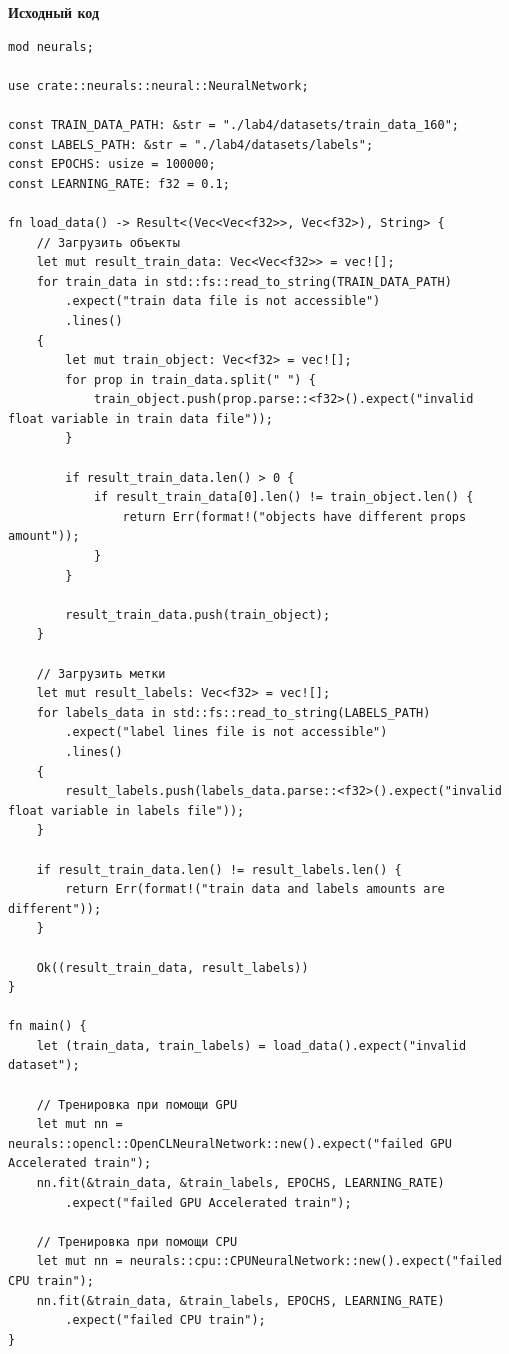 \documentclass[a4paper,14pt]{extarticle}
\begin{document}
\textbf{Исходный код}
\begin{verbatim}
mod neurals;

use crate::neurals::neural::NeuralNetwork;

const TRAIN_DATA_PATH: &str = "./lab4/datasets/train_data_160";
const LABELS_PATH: &str = "./lab4/datasets/labels";
const EPOCHS: usize = 100000;
const LEARNING_RATE: f32 = 0.1;

fn load_data() -> Result<(Vec<Vec<f32>>, Vec<f32>), String> {
    // Загрузить объекты
    let mut result_train_data: Vec<Vec<f32>> = vec![];
    for train_data in std::fs::read_to_string(TRAIN_DATA_PATH)
        .expect("train data file is not accessible")
        .lines()
    {
        let mut train_object: Vec<f32> = vec![];
        for prop in train_data.split(" ") {
            train_object.push(prop.parse::<f32>().expect("invalid float variable in train data file"));
        }

        if result_train_data.len() > 0 {
            if result_train_data[0].len() != train_object.len() {
                return Err(format!("objects have different props amount"));
            }
        }

        result_train_data.push(train_object);
    }

    // Загрузить метки
    let mut result_labels: Vec<f32> = vec![];
    for labels_data in std::fs::read_to_string(LABELS_PATH)
        .expect("label lines file is not accessible")
        .lines()
    {
        result_labels.push(labels_data.parse::<f32>().expect("invalid float variable in labels file"));
    }

    if result_train_data.len() != result_labels.len() {
        return Err(format!("train data and labels amounts are different"));
    }

    Ok((result_train_data, result_labels))
}

fn main() {
    let (train_data, train_labels) = load_data().expect("invalid dataset");

    // Тренировка при помощи GPU
    let mut nn = neurals::opencl::OpenCLNeuralNetwork::new().expect("failed GPU Accelerated train");
    nn.fit(&train_data, &train_labels, EPOCHS, LEARNING_RATE)
        .expect("failed GPU Accelerated train");

    // Тренировка при помощи CPU
    let mut nn = neurals::cpu::CPUNeuralNetwork::new().expect("failed CPU train");
    nn.fit(&train_data, &train_labels, EPOCHS, LEARNING_RATE)
        .expect("failed CPU train");
}
    
\end{verbatim}
\end{document}
